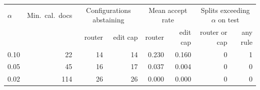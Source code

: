 \begin{tabular}{lrrrrrrr}
\toprule
$\alpha$ & Min.\ cal.\ docs & \multicolumn{2}{c}{Configurations abstaining} & \multicolumn{2}{c}{Mean accept rate} & \multicolumn{2}{c}{Splits exceeding $\alpha$ on test} \\
 & & router & edit cap & router & edit cap & router or cap & any rule \\
\midrule
0.10 & 22 & 14 & 14 & 0.230 & 0.160 & 0 & 1 \\
0.05 & 45 & 16 & 17 & 0.037 & 0.004 & 0 & 0 \\
0.02 & 114 & 26 & 26 & 0.000 & 0.000 & 0 & 0 \\
\bottomrule
\end{tabular}
